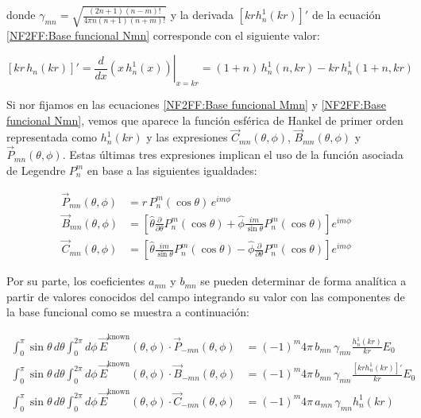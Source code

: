 \noindent
donde $\gamma_{mn} = \sqrt{\frac{(2n + 1)(n - m)!}{4\pi n(n + 1)(n + m)!}}$ y la derivada $\left[kr h^{1}_n(kr)\right]'$ de la ecuación \eqref{NF2FF:Base funcional Nmn} corresponde con el siguiente valor:

\begin{equation}
    \left[ kr \, h_n(kr) \right]' =
\left. \frac{d}{dx} \left( x \,h^{1}_n(x) \right) \right|_{x = kr} = (1 + n) \, h^{1}_n(n, kr) - kr \, h^{1}_n(1 + n, kr)
\label{NF2FF:Derivada-Hankel}
\end{equation}

Si nor fijamos en las ecuaciones \eqref{NF2FF:Base funcional Mmn} y \eqref{NF2FF:Base funcional Nmn}, vemos que aparece la función esférica de Hankel de primer orden representada como $h^{1}_n(kr)$ y las expresiones $\vec{C}_{mn}(\theta, \phi)$, $\vec{B}_{mn}(\theta, \phi)$ y $\vec{P}_{mn}(\theta, \phi)$. Estas últimas tres expresiones implican el uso de la función asociada de Legendre $P^{m}_{n}$ en base a las siguientes igualdades:

\begin{align}
\vec{P}_{mn}(\theta, \phi) &= \hat{r} \, P^{m}_{n}(\cos \theta) \, e^{im\phi} \label{NF2FF:EQ-Pmn} \\
\vec{B}_{mn}(\theta, \phi) &=
\left[ \hat{\theta} \frac{\partial}{\partial \theta} P^{m}_{n}(\cos \theta) + \hat{\phi} \frac{im}{\sin \theta} P^{m}_{n}(\cos \theta) \right] e^{im\phi}\label{NF2FF:EQ-Bmn} \\
   \vec{C}_{mn}(\theta, \phi) &=
\left[ \hat{\theta} \frac{im}{\sin \theta} P^{m}_{n}(\cos \theta) - \hat{\phi} \frac{\partial}{\partial \theta} P^{m}_{n}(\cos \theta) \right] e^{im\phi}\label{NF2FF:EQ-Cmn}
\end{align}

\newpage

Por su parte, los coeficientes $a_{mn}$ y $b_{mn}$ se pueden determinar de forma analítica a partir de valores conocidos del campo integrando su valor con las componentes de la base funcional como se muestra a continuación:

\begin{align}
\int_0^\pi \sin \theta \, d\theta \int_0^{2\pi} d\phi \, \vec{E}^{\text{known}}(\theta, \phi) \cdot \vec{P}_{-mn}(\theta, \phi) &= (-1)^m 4\pi \, b_{mn} \, \gamma_{mn} \frac{h^{1}_n(kr)}{kr} E_0\label{NF2FF:Integral-Pmn} \\
\int_0^\pi \sin \theta \, d\theta \int_0^{2\pi} d\phi \, \vec{E}^{\text{known}}(\theta, \phi) \cdot \vec{B}_{-mn}(\theta, \phi) &= (-1)^m 4\pi \, b_{mn} \, \gamma_{mn} \frac{\left[kr h^{1}_n(kr)\right]'}{kr} E_0 \label{NF2FF:Integral-Bmn} \\
\int_0^\pi \sin \theta \, d\theta \int_0^{2\pi} d\phi \, \vec{E}^{\text{known}}(\theta, \phi) \cdot \vec{C}_{-mn}(\theta, \phi) &= (-1)^m 4\pi \, a_{mn} \, \gamma_{mn} h^{1}_n(kr) \label{NF2FF:Integral-Cmn}
\end{align}

